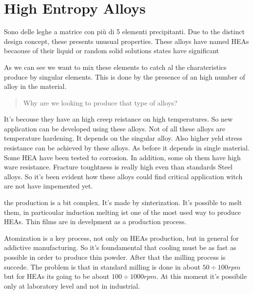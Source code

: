 \chapter{High Entropy Alloys}\label{chp:HEA}
Sono delle leghe a matrice con più di 5 elementi precipitanti.
Due to the distinct design concept, these presents unusual properties.
These alloys have named HEAs becaouse of their liquid or random solid solutions states have significant\todo{\\ADD}

As we can see we want to mix these elements to catch al the charateristics produce by singular elements.
This is done by the presence of an high number of alloy in the material.

\begin{quote}
Why are we looking to produce that type of alloys?
\end{quote}

It's becouse they have an high creep reistance on high temperatures. So new application can be developed using these alloys.
Not of all these alloys are temperature hardening. It depends on the singular alloy.
Also higher yeld stress resistance can be achieved by these alloys. As before it depends in single material.
Some HEA have been tested to corrosion. 
In addition, some oh them have high ware resistance.
Fracture toughtness is really high even than standards Steel alloys.
So it's been evident how these alloys could find critical application witch are not have impemented yet.

the production is a bit complex.
It's made by sinterization. It's possible to melt them, in particoular induction melting ist one of the most used way to produce HEAs.
Thin films are in develpment as a production process. 

Atomization is a key process, not only on HEAs production, but in general for addictive manufacturing.
So it's foundamental that cooling must be as fast as possible in order to produce thin powder.
After that the milling process is succede. The problem is that in standard milling is done in about $50\div 100 \unit{rpm}$ but for HEAs its going to be about $100 \div 1000\unit{rpm}$. At this moment it's possibile only at laboratory level and not in industrial.

